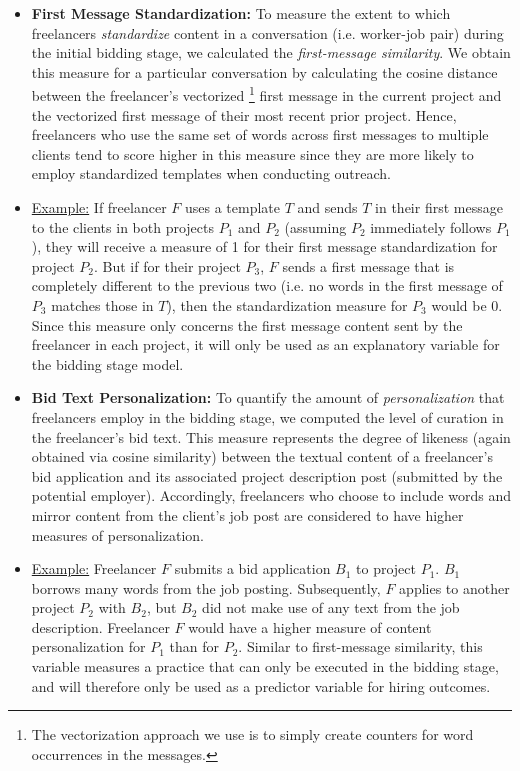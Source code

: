 \begin{itemize}
\item \textbf{First Message Standardization:} To measure the extent to which freelancers \textit{standardize} content in a conversation (i.e. worker-job pair) during the initial bidding stage, we calculated the \textit{first-message similarity}. We obtain this measure for a particular conversation by calculating the cosine distance between the freelancer's vectorized \footnote{ The vectorization approach we use is to simply create counters for word occurrences in the messages.} first message in the current project and the vectorized first message of their most recent prior project. Hence, freelancers who use the same set of words across first messages to multiple clients tend to score higher in this measure since they are more likely to employ standardized templates when conducting outreach. 

\item[\ding{46}] {\underline{Example:} If freelancer $F$ uses a template $T$ and sends $T$ in their first message to the clients in both projects $P_1$ and $P_2$ (assuming $P_2$ immediately follows $P_1$), they will receive a measure of 1 for their first message standardization for project $P_2$. But if for their project $P_3$, $F$ sends a  first message that is completely different to the previous two (i.e. no words in the first message of $P_3$ matches those in $T$), then the standardization measure for $P_3$ would be 0.} Since this measure only concerns the first message content sent by the freelancer in each project, it will only be used as an explanatory variable for the bidding stage model.

\item  \textbf{Bid Text Personalization:} To quantify the amount of \textit{personalization} that freelancers employ in the bidding stage, we computed the level of curation in the freelancer's bid text. This measure represents the degree of likeness (again obtained via cosine similarity) between the textual content of a freelancer's bid application and its associated project description post (submitted by the potential employer). Accordingly, freelancers who choose to include words and mirror content from the client's job post are considered to have higher measures of personalization. 
\item[\ding{46}] {\underline{Example:} Freelancer $F$ submits a bid application $B_1$ to project $P_1$. $B_1$ borrows many words from the job posting. Subsequently, $F$ applies to another project $P_2$ with $B_2$, but $B_2$ did not make use of any text from the job description. Freelancer $F$ would have a higher measure of content personalization for $P_1$ than for $P_2$.} Similar to first-message similarity, this variable measures a practice that can only be executed in the bidding stage, and will therefore only be used as a predictor variable for hiring outcomes.
\end{itemize}

